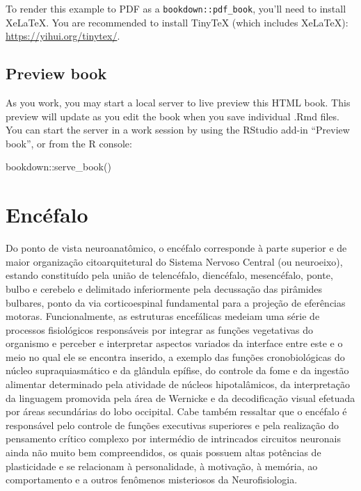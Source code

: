 \documentclass[
]{book}
\newenvironment{Shaded}{\begin{snugshade}}{\end{snugshade}}
\newcommand{\FunctionTok}[1]{\textcolor[rgb]{0.00,0.00,0.00}{#1}}
\newcommand{\NormalTok}[1]{#1}
\newcommand{\SpecialCharTok}[1]{\textcolor[rgb]{0.00,0.00,0.00}{#1}}
\theoremstyle{definition}
\theoremstyle{definition}
\theoremstyle{definition}
\theoremstyle{definition}
\theoremstyle{remark}
\begin{document}
To render this example to PDF as a \texttt{bookdown::pdf\_book}, you'll need to install XeLaTeX. You are recommended to install TinyTeX (which includes XeLaTeX): \url{https://yihui.org/tinytex/}.

\hypertarget{preview-book}{%
\section{Preview book}\label{preview-book}}

As you work, you may start a local server to live preview this HTML book. This preview will update as you edit the book when you save individual .Rmd files. You can start the server in a work session by using the RStudio add-in ``Preview book'', or from the R console:

\begin{Shaded}
\begin{Highlighting}[]
\NormalTok{bookdown}\SpecialCharTok{::}\FunctionTok{serve\_book}\NormalTok{()}
\end{Highlighting}
\end{Shaded}

\hypertarget{encuxe9falo}{%
\chapter{Encéfalo}\label{encuxe9falo}}

Do ponto de vista neuroanatômico, o encéfalo corresponde à parte superior e de maior organização citoarquitetural do Sistema Nervoso Central (ou neuroeixo), estando constituído pela união de telencéfalo, diencéfalo, mesencéfalo, ponte, bulbo e cerebelo e delimitado inferiormente pela decussação das pirâmides bulbares, ponto da via corticoespinal fundamental para a projeção de eferências motoras. Funcionalmente, as estruturas encefálicas medeiam uma série de processos fisiológicos responsáveis por integrar as funções vegetativas do organismo e perceber e interpretar aspectos variados da interface entre este e o meio no qual ele se encontra inserido, a exemplo das funções cronobiológicas do núcleo supraquiasmático e da glândula epífise, do controle da fome e da ingestão alimentar determinado pela atividade de núcleos hipotalâmicos, da interpretação da linguagem promovida pela área de Wernicke e da decodificação visual efetuada por áreas secundárias do lobo occipital. Cabe também ressaltar que o encéfalo é responsável pelo controle de funções executivas superiores e pela realização do pensamento crítico complexo por intermédio de intrincados circuitos neuronais ainda não muito bem compreendidos, os quais possuem altas potências de plasticidade e se relacionam à personalidade, à motivação, à memória, ao comportamento e a outros fenômenos misteriosos da Neurofisiologia.
\end{document}
